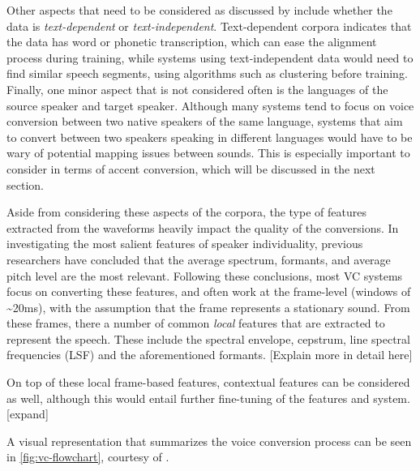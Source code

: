 \documentclass
[
    a4paper,
    twoside,
    12pt
]
{report}
\begin{document}
Other aspects that need to be considered as discussed by
\textcite{mohammadi2017} include whether the data is
\emph{text-dependent} or \emph{text-independent}. Text-dependent corpora
indicates that the data has word or phonetic transcription, which can
ease the alignment process during training, while systems using
text-independent data would need to find similar speech segments, using
algorithms such as clustering before training. Finally, one minor aspect
that is not considered often is the languages of the source speaker and
target speaker. Although many systems tend to focus on voice conversion
between two native speakers of the same language, systems that aim to
convert between two speakers speaking in different languages would have
to be wary of potential mapping issues between sounds. This is
especially important to consider in terms of accent conversion, which
will be discussed in the next section.

Aside from considering these aspects of the corpora, the type of
features extracted from the waveforms heavily impact the quality of the
conversions. In investigating the most salient features of speaker
individuality, previous researchers have concluded that the average
spectrum, formants, and average pitch level are the most relevant.
Following these conclusions, most VC systems focus on converting these
features, and often work at the frame-level (windows of
\textasciitilde{}20ms), with the assumption that the frame represents a
stationary sound. From these frames, there a number of common
\emph{local} features that are extracted to represent the speech. These
include the spectral envelope, cepstrum, line spectral frequencies (LSF)
and the aforementioned formants. {[}Explain more in detail here{]}

On top of these local frame-based features, contextual features can be
considered as well, although this would entail further fine-tuning of
the features and system. {[}expand{]}

A visual representation that summarizes the voice conversion process can
be seen in \autoref{fig:vc-flowchart}, courtesy of
\textcite{mohammadi2017}.
\end{document}
